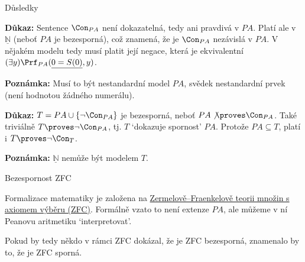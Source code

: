 \documentclass{beamer}
\begin{document}
\begin{frame}{Důsledky}    

    \pause

    \pause
    \textbf{Důkaz:}
        Sentence $\Con_{PA}$ není dokazatelná, tedy ani pravdivá v $PA$. Platí ale v $\underline{\mathbb N}$ (neboť $PA$ je bezesporná), což znamená, že je $\Con_{PA}$ nezávislá v $PA$. V nějakém modelu tedy musí platit její negace, která je ekvivalentní $(\exists y)\Prf_{PA}(\underline{0=S(0)},y)$.            
    \hfill\qedsymbol

    \pause
    \textbf{Poznámka:} Musí to být nestandardní model $PA$, svědek \alert{nestandardní} prvek (není hodnotou žádného numerálu).

    \bigskip

    \pause

    \pause
    \textbf{Důkaz:}
    $T=PA \cup \{\neg \Con_{PA}\}$ je \alert{bezesporná}, neboť $PA\not\proves\Con_{PA}$. Také triviálně $T\proves\neg\Con_{PA}$, tj. $T$ `dokazuje spornost' $PA$. Protože $PA\subseteq T$, platí i $T\proves\neg\Con_T$.
    \hfill\qedsymbol

    \pause
    \textbf{Poznámka:} $\underline{\mathbb{N}}$ nemůže být modelem $T$.
    
\end{frame}


\begin{frame}{Bezespornost ZFC}

    \pause
    Formalizace matematiky je založena na \href{https://en.wikipedia.org/wiki/Zermelo\%E2\%80\%93Fraenkel_set_theory}{\alert{Zermelově–Fraenkelově teorii množin s axiomem výběru (ZFC)}}. Formálně vzato to není extenze $PA$, ale můžeme v ní Peanovu aritmetiku `interpretovat'.

    \pause

    \pause
    Pokud by tedy někdo v rámci ZFC dokázal, že je ZFC bezesporná, znamenalo by to, že je ZFC sporná.    

\end{frame}
\end{document}

